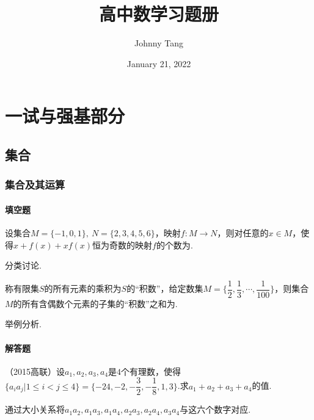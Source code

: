 \documentclass[lang=cn, zihao=4.5]{elegantbook}
\title{高中数学习题册}
\subtitle
\author{Johnny Tang}
\institute{DEEP Team}
\date{January 21, 2022}
\newcommand{\tk}{\uline{\hspace{4em}}}
\begin{document}
\maketitle

\frontmatter

\mainmatter

\tableofcontents

\newpage

\part{一试与强基部分}

\chapter{集合}

\section{集合及其运算}

\subsection*{填空题}

\begin{example} %
	设集合$M=\{ -1,0,1 \} , ~N=\{ 2,3,4,5,6 \}$，映射$f:M \to N$，则对任意的$x \in M$，使得$x + f(x) +xf(x)$恒为奇数的映射$f$的个数为\tk .
\end{example}
\begin{hint}
	分类讨论.
\end{hint}

\begin{example}
	称有限集$S$的所有元素的乘积为$S$的“积数”，给定数集$M= \{ \dfrac{1}{2},\dfrac{1}{3}, \cdots ,\dfrac{1}{100} \}$，则集合$M$的所有含偶数个元素的子集的“积数”之和为\tk .
\end{example}
\begin{hint}
	举例分析.
\end{hint}

\subsection*{解答题}

\begin{example} %
	（2015高联）设$a_1,a_2,a_3,a_4$是$4$个有理数，使得$\{ a_ia_j | 1 \leq i < j \leq 4 \} = \{ -24,-2,-\dfrac{3}{2},-\dfrac{1}{8},1,3 \}$.求$a_1+a_2+a_3+a_4$的值.
\end{example}
\begin{hint}
	通过大小关系将$a_1a_2,a_1a_3,a_1a_4,a_2a_3,a_2a_4,a_3a_4$与这六个数字对应.
\end{hint}
\end{document}
